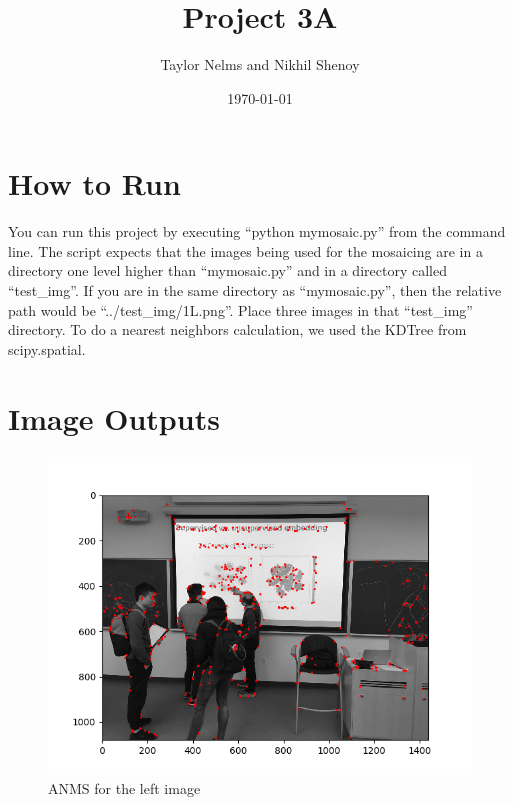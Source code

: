 \documentclass[10pt]{article}
\begin{document}
\title{\vspace{-2.0cm}Project 3A}
\author{Taylor Nelms and Nikhil Shenoy}
\date{\today}

\maketitle

\section{How to Run}
You can run this project by executing ``python mymosaic.py'' from the command line. The script expects that the images being used for the mosaicing are in a directory one level higher than ``mymosaic.py'' and in a directory called ``test\_img''. If you are in the same directory as ``mymosaic.py'', then the relative path would be ``../test\_img/1L.png''. Place three images in that ``test\_img'' directory. To do a nearest neighbors calculation, we used the KDTree from scipy.spatial.

\section{Image Outputs}


	\begin{figure}[h]
		\caption{ANMS for the left image}
		\centering
		\includegraphics{img/anmsL.png}
	\end{figure}
	
\end{document}
